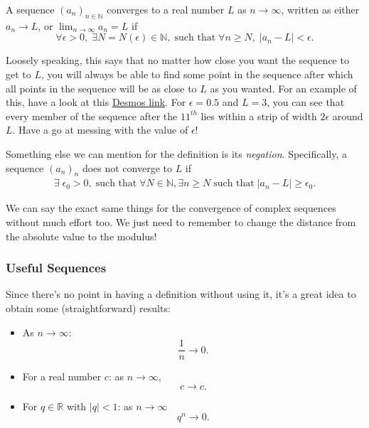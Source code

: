 \documentclass[
  10pt,
  a4paper]{article}
\providecommand{\tightlist}{%
  \setlength{\itemsep}{0pt}\setlength{\parskip}{0pt}}
\theoremstyle{plain}
\theoremstyle{definition}
\theoremstyle{plain}
\theoremstyle{plain}
\theoremstyle{plain}
\theoremstyle{plain}
\theoremstyle{definition}
\theoremstyle{definition}
\theoremstyle{remark}
\theoremstyle{remark}
\let\BeginKnitrBlock\begin \let\EndKnitrBlock\end
\begin{document}
\BeginKnitrBlock{definition}[Sequence Convergence]
{\label{def:def2} }A sequence \((a_n)_{n\in\mathbb{N}}\) converges to a real number \(L\) as \(n \longrightarrow \infty\), written as either \(a_n \longrightarrow L\), or \(\lim_{n \to \infty}a_n = L\) if \[\forall \epsilon > 0, \; \exists N = N(\epsilon) \in \mathbb{N}, \; \text{such that} \; \forall n \geq N, \; \lvert a_n - L \rvert < \epsilon.\]
\EndKnitrBlock{definition}
Loosely speaking, this says that no matter how close you want the sequence to get to \(L\), you will always be able to find some point in the sequence after which all points in the sequence will be as close to \(L\) as you wanted. For an example of this, have a look at this \href{https://www.desmos.com/calculator/dfkjgg0wzj}{Desmos link}. For \(\epsilon = 0.5\) and \(L = 3\), you can see that every member of the sequence after the \(11^{th}\) lies within a strip of width \(2\epsilon\) around \(L\). Have a go at messing with the value of \(\epsilon\)!

Something else we can mention for the definition is its \emph{negation}. Specifically, a sequence \((a_n)_n\) does not converge to \(L\) if
\begin{align*}
    \exists\; \epsilon_0 > 0, \; \text{such that} \; \forall N \in \mathbb{N}, \exists n \geq N \; \text{such that} \; \lvert a_n - L \rvert \geq \epsilon_0.
\end{align*}

We can say the exact same things for the convergence of complex sequences without much effort too. We just need to remember to change the distance from the absolute value to the modulus!

\hypertarget{useful-sequences}{%
\subsubsection{Useful Sequences}\label{useful-sequences}}

Since there's no point in having a definition without using it, it's a great idea to obtain some (straightforward) results:

\begin{itemize}
\tightlist
\item
  As \(n \longrightarrow \infty\): \[\frac{1}{n} \longrightarrow 0.\]
\item
  For a real number \(c\): as \(n \longrightarrow \infty\), \[c \longrightarrow c.\]
\item
  For \(q \in \mathbb{R}\) with \(\lvert q \rvert < 1\): as \(n \longrightarrow \infty\) \[q^n \longrightarrow 0.\]
\end{itemize}
\end{document}
